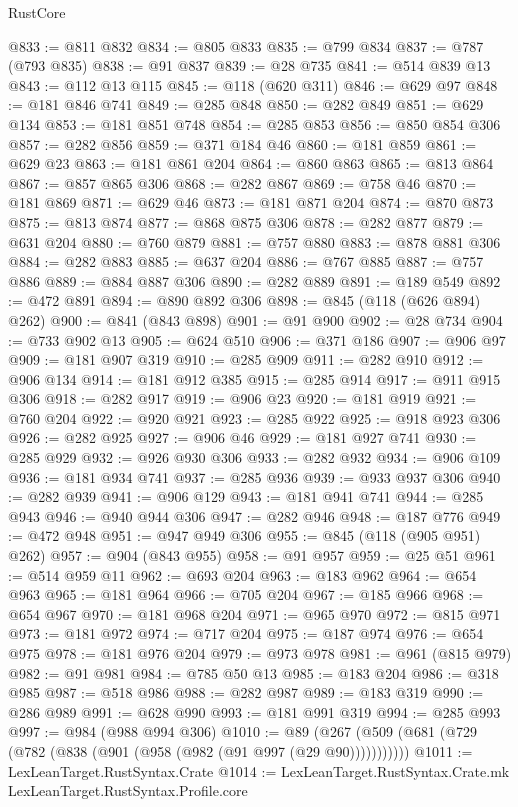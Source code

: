 \begin{lexlean}{RustCore}
\begin{coremodule}
@833 := @811 @832
@834 := @805 @833
@835 := @799 @834
@837 := @787 (@793 @835)
@838 := @91 @837
@839 := @28 @735
@841 := @514 @839 @13
@843 := @112 @13 @115
@845 := @118 (@620 @311)
@846 := @629 @97
@848 := @181 @846 @741
@849 := @285 @848
@850 := @282 @849
@851 := @629 @134
@853 := @181 @851 @748
@854 := @285 @853
@856 := @850 @854 @306
@857 := @282 @856
@859 := @371 @184 @46
@860 := @181 @859
@861 := @629 @23
@863 := @181 @861 @204
@864 := @860 @863
@865 := @813 @864
@867 := @857 @865 @306
@868 := @282 @867
@869 := @758 @46
@870 := @181 @869
@871 := @629 @46
@873 := @181 @871 @204
@874 := @870 @873
@875 := @813 @874
@877 := @868 @875 @306
@878 := @282 @877
@879 := @631 @204
@880 := @760 @879
@881 := @757 @880
@883 := @878 @881 @306
@884 := @282 @883
@885 := @637 @204
@886 := @767 @885
@887 := @757 @886
@889 := @884 @887 @306
@890 := @282 @889
@891 := @189 @549
@892 := @472 @891
@894 := @890 @892 @306
@898 := @845 (@118 (@626 @894) @262)
@900 := @841 (@843 @898)
@901 := @91 @900
@902 := @28 @734
@904 := @733 @902 @13
@905 := @624 @510
@906 := @371 @186
@907 := @906 @97
@909 := @181 @907 @319
@910 := @285 @909
@911 := @282 @910
@912 := @906 @134
@914 := @181 @912 @385
@915 := @285 @914
@917 := @911 @915 @306
@918 := @282 @917
@919 := @906 @23
@920 := @181 @919
@921 := @760 @204
@922 := @920 @921
@923 := @285 @922
@925 := @918 @923 @306
@926 := @282 @925
@927 := @906 @46
@929 := @181 @927 @741
@930 := @285 @929
@932 := @926 @930 @306
@933 := @282 @932
@934 := @906 @109
@936 := @181 @934 @741
@937 := @285 @936
@939 := @933 @937 @306
@940 := @282 @939
@941 := @906 @129
@943 := @181 @941 @741
@944 := @285 @943
@946 := @940 @944 @306
@947 := @282 @946
@948 := @187 @776
@949 := @472 @948
@951 := @947 @949 @306
@955 := @845 (@118 (@905 @951) @262)
@957 := @904 (@843 @955)
@958 := @91 @957
@959 := @25 @51
@961 := @514 @959 @11
@962 := @693 @204
@963 := @183 @962
@964 := @654 @963
@965 := @181 @964
@966 := @705 @204
@967 := @185 @966
@968 := @654 @967
@970 := @181 @968 @204
@971 := @965 @970
@972 := @815 @971
@973 := @181 @972
@974 := @717 @204
@975 := @187 @974
@976 := @654 @975
@978 := @181 @976 @204
@979 := @973 @978
@981 := @961 (@815 @979)
@982 := @91 @981
@984 := @785 @50 @13
@985 := @183 @204
@986 := @318 @985
@987 := @518 @986
@988 := @282 @987
@989 := @183 @319
@990 := @286 @989
@991 := @628 @990
@993 := @181 @991 @319
@994 := @285 @993
@997 := @984 (@988 @994 @306)
@1010 := @89 (@267 (@509 (@681 (@729 (@782 (@838 (@901 (@958 (@982 (@91 @997 (@29 @90)))))))))))
@1011 := LexLeanTarget.RustSyntax.Crate
@1014 := LexLeanTarget.RustSyntax.Crate.mk LexLeanTarget.RustSyntax.Profile.core

\end{coremodule}
\end{lexlean}
